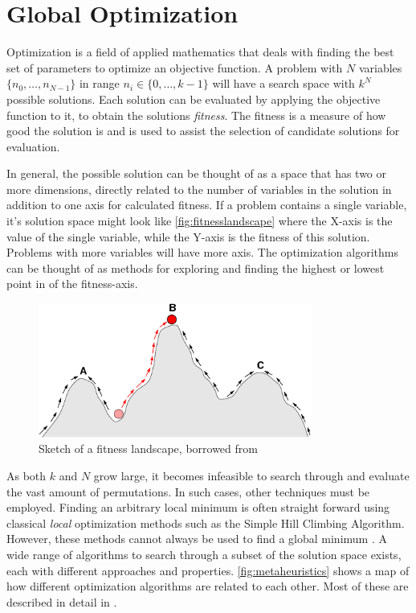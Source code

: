 \section{Global Optimization}

Optimization is a field of applied mathematics that deals with finding the best
set of parameters to optimize an objective function. A problem with $N$
variables $\{n_0, \dots, n_{N-1}\}$ in range $n_i \in \{0, \dots, k-1\}$ will
have a search space with $k^N$ possible solutions. Each solution can be
evaluated by applying the objective function to it, to obtain the solutions
\emph{fitness}. The fitness is a measure of how good the solution is and is used
to assist the selection of candidate solutions for evaluation.

In general, the possible solution can be thought of as a space that has two or
more dimensions, directly related to the number of variables in the solution
in addition to one axis for calculated fitness. If a problem contains a single
variable, it's solution space might look like \autoref{fig:fitnesslandscape}
where the X-axis is the value of the single variable, while the Y-axis is the
fitness of this solution. Problems with more variables will have more axis. The
optimization algorithms can be thought of as methods for exploring and finding
the highest or lowest point in of the fitness-axis.

\begin{figure}
    \centering
    \includegraphics[width=0.8\textwidth]{figs/Fitness-landscape-cartoon.png}
    \caption{Sketch of a fitness landscape, borrowed from \cite{wikifitnesslandscape}}
    \label{fig:fitnesslandscape}
\end{figure}

As both $k$ and $N$ grow large, it becomes infeasible to search through and
evaluate the vast amount of permutations. In such cases, other techniques must
be employed. Finding an arbitrary local minimum is often straight forward using
classical \emph{local} optimization methods such as the Simple Hill Climbing
Algorithm. However, these methods cannot always be used to find a global minimum
\cite{russellnorvig}. A wide range of algorithms to search through a subset of
the solution space exists, each with different approaches and properties.
\autoref{fig:metaheuristics} shows a map of how different optimization
algorithms are related to each other. Most of these are described in detail in
\cite{russellnorvig}.

